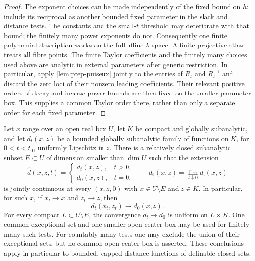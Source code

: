 \begin{proof}
The exponent choices can be made independently of the fixed bound on $h$: include its reciprocal as another bounded fixed parameter in the slack and distance tests. The constants and the small-$t$ threshold may deteriorate with that bound; the finitely many power exponents do not. Consequently one finite polynomial description works on the full affine $h$-space. A finite projective atlas treats all fibre points. The finite Taylor coefficients and the finitely many choices used above are analytic in external parameters after generic restriction. In particular, apply \cref{lem:prep-puiseux} jointly to the entries of $R_t$ and $R_t^{-1}$ and discard the zero loci of their nonzero leading coefficients. Their relevant positive orders of decay and inverse power bounds are then fixed on the smaller parameter box. This supplies a common Taylor order there, rather than only a separate order for each fixed parameter.
\end{proof}

\begin{lemma}
\label{lem:prep-generic-distance-convergence}
Let $x$ range over an open real box $U$, let $K$ be compact and globally subanalytic, and let $d_t(x,z)$ be a bounded globally subanalytic family of functions on $K$, for $0<t<t_0$, uniformly Lipschitz in $z$. There is a relatively closed subanalytic subset $E\subset U$ of dimension smaller than $\dim U$ such that the extension
\[
 \widehat d(x,z,t)=
 \begin{cases}
 d_t(x,z),&t>0,\\
 d_0(x,z),&t=0,
 \end{cases}
 \qquad d_0(x,z)=\lim_{t\downarrow0}d_t(x,z)
\]
is jointly continuous at every $(x,z,0)$ with $x\in U\setminus E$ and $z\in K$. In particular, for such $x$, if $x_t\to x$ and $z_t\to z$, then
\[
 d_t(x_t,z_t)\longrightarrow d_0(x,z).
\]
For every compact $L\subset U\setminus E$, the convergence $d_t\to d_0$ is uniform on $L\times K$. One common exceptional set and one smaller open center box may be used for finitely many such tests. For countably many tests one may exclude the union of their exceptional sets, but no common open center box is asserted. These conclusions apply in particular to bounded, capped distance functions of definable closed sets.
\end{lemma}

